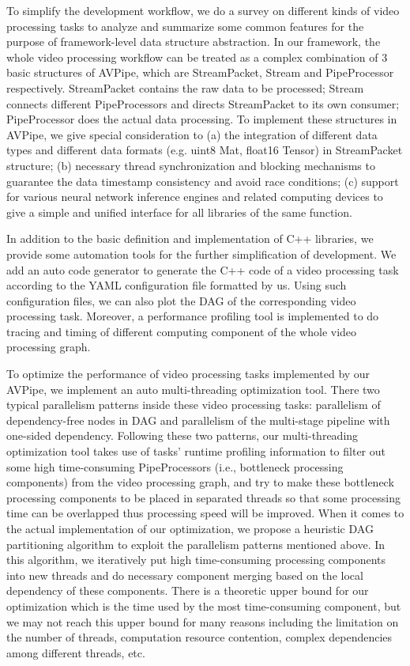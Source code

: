 \begin{bigabstract}
To simplify the development workflow, we do a survey on different kinds of video processing tasks to analyze and summarize some common features for the purpose of framework-level data structure abstraction. In our framework, the whole video processing workflow can be treated as a complex combination of 3 basic structures of AVPipe, which are StreamPacket, Stream and PipeProcessor respectively. StreamPacket contains the raw data to be processed; Stream connects different PipeProcessors and directs StreamPacket to its own consumer; PipeProcessor does the actual data processing. To implement these structures in AVPipe, we give special consideration to (a) the integration of different data types and different data formats (e.g. uint8 Mat, float16 Tensor) in StreamPacket structure; (b) necessary thread synchronization and blocking mechanisms to guarantee the data timestamp consistency and avoid race conditions; (c) support for various neural network inference engines and related computing devices to give a simple and unified interface for all libraries of the same function. 

In addition to the basic definition and implementation of C++ libraries, we provide some automation tools for the further simplification of development. We add an auto code generator to generate the C++ code of a video processing task according to the YAML configuration file formatted by us. Using such configuration files, we can also plot the DAG of the corresponding video processing task. Moreover, a performance profiling tool is implemented to do tracing and timing of different computing component of the whole video processing graph.

To optimize the performance of video processing tasks implemented by our AVPipe, we implement an auto multi-threading optimization tool. There two typical parallelism patterns inside these video processing tasks: parallelism of dependency-free nodes in DAG and parallelism of the multi-stage pipeline with one-sided dependency.  Following these two patterns, our multi-threading optimization tool takes use of tasks' runtime profiling information to filter out some high time-consuming PipeProcessors (i.e., bottleneck processing components) from the video processing graph, and try to make these bottleneck processing components to be placed in separated threads so that some processing time can be overlapped thus processing speed will be improved. When it comes to the actual implementation of our optimization, we propose a heuristic DAG partitioning algorithm to exploit the parallelism patterns mentioned above. In this algorithm, we iteratively put high time-consuming processing components into new threads and do necessary component merging based on the local dependency of these components. There is a theoretic upper bound for our optimization which is the time used by the most time-consuming component, but we may not reach this upper bound for many reasons including the limitation on the number of threads, computation resource contention, complex dependencies among different threads, etc.


\end{bigabstract}
